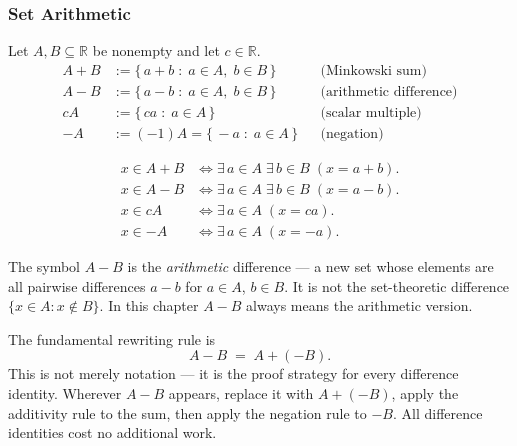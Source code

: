 \subsubsection{Set Arithmetic}

\begin{tcolorbox}[colback=propbox, colframe=propborder, arc=2pt,
  left=6pt, right=6pt, top=4pt, bottom=4pt,
  title={\small\textbf{Definition (Set Arithmetic)}},
  fonttitle=\small\bfseries]
\label{def:set-arithmetic}
Let $A, B \subseteq \mathbb{R}$ be nonempty and let $c \in \mathbb{R}$.
\begin{align*}
A + B &:= \{\, a + b \;:\; a \in A,\; b \in B \,\}
         && \text{(Minkowski sum)} \\
A - B &:= \{\, a - b \;:\; a \in A,\; b \in B \,\}
         && \text{(arithmetic difference)} \\
cA   &:= \{\, ca     \;:\; a \in A \,\}
         && \text{(scalar multiple)} \\
-A   &:= (-1)A = \{\, -a \;:\; a \in A \,\}
         && \text{(negation)}
\end{align*}
\end{tcolorbox}

\begin{remark*}
\begin{align*}
x \in A+B  &\iff \exists\, a \in A\;\exists\, b \in B\;(x = a+b). \\
x \in A-B  &\iff \exists\, a \in A\;\exists\, b \in B\;(x = a-b). \\
x \in cA   &\iff \exists\, a \in A\;(x = ca). \\
x \in {-A} &\iff \exists\, a \in A\;(x = -a).
\end{align*}
\end{remark*}

\begin{remark*}[Notation]
The symbol $A - B$ is the \emph{arithmetic} difference — a new set whose
elements are all pairwise differences $a - b$ for $a \in A$, $b \in B$.
It is not the set-theoretic difference $\{x \in A : x \notin B\}$.
In this chapter $A - B$ always means the arithmetic version.
\end{remark*}

\begin{remark*}[$A - B = A + (-B)$]
\label{rem:diff-as-sum}
The fundamental rewriting rule is
\[
  A - B \;=\; A + (-B).
\]
This is not merely notation — it is the proof strategy for every
difference identity. Wherever $A - B$ appears, replace it with
$A + (-B)$, apply the additivity rule to the sum, then apply the negation
rule to $-B$. All difference identities cost no additional work.
\end{remark*}

